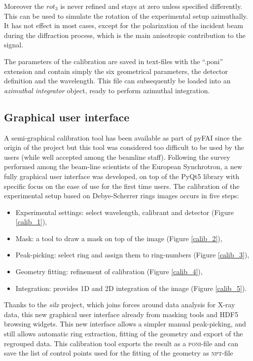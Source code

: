 \documentclass[preprint, pdf]{iucr}              %
\begin{document}
Moreover the $rot_3$ is never refined and stays at zero unless specified
differently.  This can be used to simulate the rotation of the
experimental setup azimuthally.
It has not effect in most cases, except for the
polarization of the incident beam during the diffraction process, which is the
main anisotropic contribution to the signal.

The parameters of the calibration are saved in text-files with the ``.poni''
extension and contain simply the six geometrical parameters, the detector
definition and the wavelength.
This file can subsequently be loaded into an \textit{azimuthal integrator}
object, ready to perform azimuthal integration.

\subsection{Graphical user interface}

A semi-graphical calibration tool has been available as part of pyFAI
\cite{fv5028} since the origin of the project but this tool was considered too
difficult to be used by the users (while well accepted among the beamline
staff).
Following the survey performed among the beam-line scientists of the European
Synchrotron, a new fully graphical user interface was developed, on top of
the PyQt5 library \cite{pyqt} with specific focus on the ease of use for the
first time users.
The calibration of the experimental setup based on Debye-Scherrer rings images
occurs in five steps:
\begin{itemize}
  \item Experimental settings: select wavelength, calibrant and detector (Figure
  \ref{calib_1}),
  \item Mask: a tool to draw a mask on top of the image (Figure
  \ref{calib_2}),
  \item Peak-picking: select ring and assign them to ring-numbers (Figure
  \ref{calib_3}),
  \item Geometry fitting: refinement of calibration (Figure
  \ref{calib_4}),
  \item Integration: provides 1D and 2D integration of the image (Figure
  \ref{calib_5}).
\end{itemize}

Thanks to the \textit{silx} \cite{silx} project, which joins
forces around data analysis for X-ray data, this new graphical user interface
already from masking tools and HDF5 browsing widgets.
This new interface allows a simpler manual peak-picking,
and still allows automatic ring extraction, fitting of the geometry and export
of the regrouped data.
This calibration tool exports the result as a \textsc{poni}-file and can
save the list of control points used  for the fitting of the geometry as
\textsc{npt}-file
\end{document}
